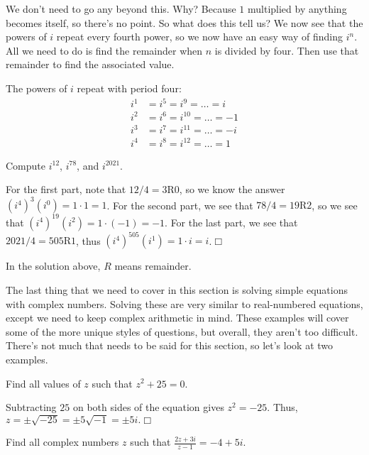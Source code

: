 \documentclass[lang=en,11pt]{elegantbook}
\begin{document}
\noindent We don't need to go any beyond this.  Why?  Because $1$ multiplied by anything becomes itself, so there's no point.  So what does this tell us?  We now see that the powers of $i$ repeat every fourth power, so we now have an easy way of finding $i^n$.  All we need to do is find the remainder when $n$ is divided by four.  Then use that remainder to find the associated value.
\begin{note}
The powers of $i$ repeat with period four:
\begin{align*}
    i^1&=i^5=i^9 = \ldots=i \\
    i^2&=i^6=i^{10}=\ldots=-1 \\
    i^3&=i^7=i^{11}=\ldots=-i \\
    i^4&=i^8=i^{12}=\ldots=1
\end{align*}
\end{note}
\begin{example}
Compute $i^{12}$, $i^{78}$, and $i^{2021}$.
\end{example}
\begin{solution}
For the first part, note that $12/4=3\text{R}0$, so we know the answer $\left(i^4\right)^3\left(i^0\right)=1\cdot 1=1$.  For the second part, we see that $78/4=19\text{R}2$, so we see that $\left(i^4\right)^{19}\left(i^2\right)=1\cdot \left(-1\right)=-1$.  For the last part, we see that $2021/4=505\text{R}1$, thus $\left(i^4\right)^{505}\left(i^1\right)=1\cdot i=i$.$\Box$
\end{solution}
\begin{remark}
  In the solution above, $R$ means remainder.
\end{remark}
\noindent The last thing that we need to cover in this section is solving simple equations with complex numbers.  Solving these are very similar to real-numbered equations, except we need to keep complex arithmetic in mind.  These examples will cover some of the more unique styles of questions, but overall, they aren't too difficult.  There's not much that needs to be said for this section, so let's look at two examples.  
\begin{example}
Find all values of $z$ such that $z^2+25=0$.
\end{example}
\begin{solution}
Subtracting $25$ on both sides of the equation gives $z^2=-25$.  Thus, $z=\pm\sqrt{-25}=\pm 5\sqrt{-1}=\pm 5i.$$\Box$
\end{solution}
\begin{example}
Find all complex numbers $z$ such that $\displaystyle \frac{2z+3i}{z-1}=-4+5i$.
\end{example}
\end{document}
